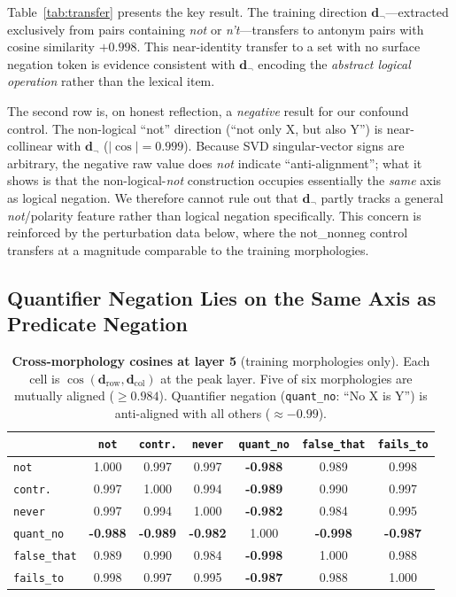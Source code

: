 \documentclass{article}
\begin{document}
Table~\ref{tab:transfer} presents the key result.
The training direction $\mathbf{d}_{\neg}$---extracted exclusively from pairs containing \textit{not} or \textit{n't}---transfers to antonym pairs with cosine similarity $+0.998$.
This near-identity transfer to a set with no surface negation token is evidence consistent with $\mathbf{d}_{\neg}$ encoding the \emph{abstract logical operation} rather than the lexical item.

The second row is, on honest reflection, a \emph{negative} result for our confound control. The non-logical ``not'' direction (``not only X, but also Y'') is near-collinear with $\mathbf{d}_{\neg}$ ($|\cos| = 0.999$). Because SVD singular-vector signs are arbitrary, the negative raw value does \emph{not} indicate ``anti-alignment''; what it shows is that the non-logical-\textit{not} construction occupies essentially the \emph{same} axis as logical negation. We therefore cannot rule out that $\mathbf{d}_{\neg}$ partly tracks a general \textit{not}/polarity feature rather than logical negation specifically. This concern is reinforced by the perturbation data below, where the not\_nonneg control transfers at a magnitude comparable to the training morphologies.

\subsection{Quantifier Negation Lies on the Same Axis as Predicate Negation}
\label{sec:res_quant}

\begin{table}[h]
  \centering
  \small
  \caption{\textbf{Cross-morphology cosines at layer 5} (training morphologies only). Each cell is $\cos(\mathbf{d}_{\text{row}}, \mathbf{d}_{\text{col}})$ at the peak layer. Five of six morphologies are mutually aligned ($\geq 0.984$). Quantifier negation (\texttt{quant\_no}: ``No X is Y'') is anti-aligned with all others ($\approx -0.99$).}
  \label{tab:cross}
  \begin{tabular}{lcccccc}
    \toprule
     & \texttt{not} & \texttt{contr.} & \texttt{never} & \texttt{quant\_no} & \texttt{false\_that} & \texttt{fails\_to} \\
    \midrule
    \texttt{not}        & 1.000 & 0.997 & 0.997 & \textbf{-0.988} & 0.989 & 0.998 \\
    \texttt{contr.}     & 0.997 & 1.000 & 0.994 & \textbf{-0.989} & 0.990 & 0.997 \\
    \texttt{never}      & 0.997 & 0.994 & 1.000 & \textbf{-0.982} & 0.984 & 0.995 \\
    \texttt{quant\_no}  & \textbf{-0.988} & \textbf{-0.989} & \textbf{-0.982} & 1.000 & \textbf{-0.998} & \textbf{-0.987} \\
    \texttt{false\_that}& 0.989 & 0.990 & 0.984 & \textbf{-0.998} & 1.000 & 0.988 \\
    \texttt{fails\_to}  & 0.998 & 0.997 & 0.995 & \textbf{-0.987} & 0.988 & 1.000 \\
    \bottomrule
  \end{tabular}
\end{table}
\end{document}
